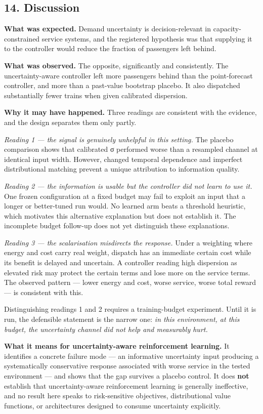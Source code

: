 \documentclass[
]{article}
\begin{document}
\subsection{14. Discussion}\label{14-discussion}

\textbf{What was expected.} Demand uncertainty is decision-relevant in
capacity-constrained service systems, and the registered hypothesis was
that supplying it to the controller would reduce the fraction of
passengers left behind.

\textbf{What was observed.} The opposite, significantly and
consistently. The uncertainty-aware controller left more passengers
behind than the point-forecast controller, and more than a past-value
bootstrap placebo. It also dispatched substantially fewer trains when
given calibrated dispersion.

\textbf{Why it may have happened.} Three readings are consistent with
the evidence, and the design separates them only partly.

\emph{Reading 1 --- the signal is genuinely unhelpful in this setting.}
The placebo comparison shows that calibrated σ performed worse than a
resampled channel at identical input width. However, changed temporal
dependence and imperfect distributional matching prevent a unique
attribution to information quality.

\emph{Reading 2 --- the information is usable but the controller did not
learn to use it.} One frozen configuration at a fixed budget may fail to
exploit an input that a longer or better-tuned run would. No learned arm
beats a threshold heuristic, which motivates this alternative
explanation but does not establish it. The incomplete budget follow-up
does not yet distinguish these explanations.

\emph{Reading 3 --- the scalarisation misdirects the response.} Under a
weighting where energy and cost carry real weight, dispatch has an
immediate certain cost while its benefit is delayed and uncertain. A
controller reading high dispersion as elevated risk may protect the
certain terms and lose more on the service terms. The observed pattern
--- lower energy and cost, worse service, worse total reward --- is
consistent with this.

Distinguishing readings 1 and 2 requires a training-budget experiment.
Until it is run, the defensible statement is the narrow one: \emph{in
this environment, at this budget, the uncertainty channel did not help
and measurably hurt.}

\textbf{What it means for uncertainty-aware reinforcement learning.} It
identifies a concrete failure mode --- an informative uncertainty input
producing a systematically conservative response associated with worse
service in the tested environment --- and shows that the gap survives a
placebo control. It does \textbf{not} establish that uncertainty-aware
reinforcement learning is generally ineffective, and no result here
speaks to risk-sensitive objectives, distributional value functions, or
architectures designed to consume uncertainty explicitly.
\end{document}
